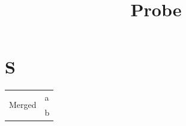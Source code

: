 \documentclass{article}
\title{Probe}
\begin{document}
\section{S}
\begin{tabular}{ll}\multirow{2}{*}{Merged} & a \\ & b\end{tabular}
\end{document}
